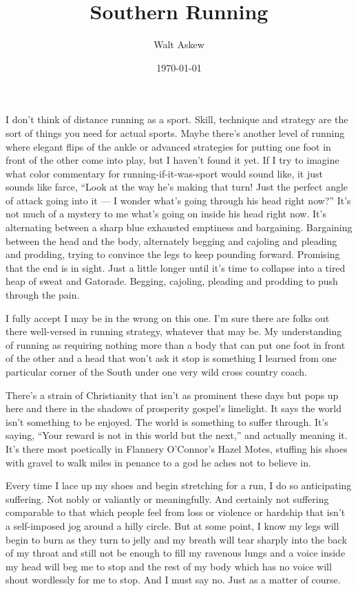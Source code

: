 \documentclass[14pt, oneside]{memoir}
\title{Southern Running}
\author{Walt Askew}
\date{\today}
\begin{document}
\maketitle

I don't think of distance running as a sport.
Skill, technique and strategy are the sort of things you need for
actual sports.
Maybe there's another level of running where elegant flips of the
ankle or advanced strategies for putting one foot in front of the
other come into play, but I haven't found it yet.
If I try to imagine what color commentary for running-if-it-was-sport
would sound like, it just sounds like farce,
``Look at the way he's making that turn! Just the perfect angle of
attack going into it --- I wonder what's going through his head right
now?''
It's not much of a mystery to me what's going on inside his head right
now. 
It's alternating between a sharp blue exhausted emptiness and
bargaining.
Bargaining between the head and the body, alternately begging and
cajoling and pleading and prodding, trying to convince the legs to
keep pounding forward.
Promising that the end is in sight.
Just a little longer until it's time to collapse into a tired heap of
sweat and Gatorade. 
Begging, cajoling, pleading and prodding to push through the pain.

I fully accept I may be in the wrong on this one.
I'm sure there are folks out there well-versed in running strategy,
whatever that may be.
My understanding of running as requiring nothing more than a body that
can put one foot in front of the other and a head that won't ask it
stop is something I learned from one particular corner of the South
under one very wild cross country coach.

There's a strain of Christianity that isn't as prominent these days
but pops up here and there in the shadows of prosperity gospel's
limelight.
It says the world isn't something to be enjoyed.
The world is something to suffer through.
It's saying, ``Your reward is not in this world but the next,'' and
actually meaning it.
It's there most poetically in Flannery O'Connor's Hazel Motes,
stuffing his shoes with gravel to walk miles in penance to a god he
aches not to believe in.

Every time I lace up my shoes and begin stretching for a run, I do
so anticipating suffering.
Not nobly or valiantly or meaningfully.
And certainly not suffering comparable to that which people feel from
loss or violence or hardship that isn't a self-imposed jog around a
hilly circle.
But at some point, I know my legs will begin to burn as they turn to
jelly and my breath will tear sharply into the back of my throat and
still not be enough to fill my ravenous lungs and a voice inside my
head will beg me to stop and the rest of my body which has no voice
will shout wordlessly for me to stop.
And I must say no.
Just as a matter of course.
\end{document}

